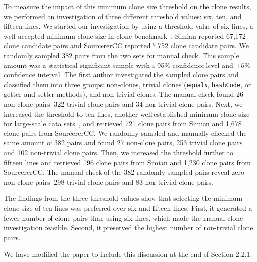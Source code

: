 \documentclass[a4paper,twoside,10pt]{reviewresponse}
\begin{document}
To measure the impact of this minimum clone size threshold on the clone results, 
we performed an investigation of three different threshold values: six, ten, and fifteen lines. 
We started our investigation by using a threshold value of six
lines, a well-accepted minimum clone size in clone benchmark~\cite{Bellon2007}.
Simian reported 67,172 clone candidate pairs and SourcererCC reported 7,752
clone candidate pairs. We randomly sampled 382 pairs from the two sets for
manual check. This sample amount was a statistical significant sample with a
95\% confidence level and $\pm 5\%$ confidence interval. The first author
investigated the sampled clone pairs and classified them into three groups:
non-clones, trivial clones (\texttt{equals}, \texttt{hashCode}, or getter and
setter methods), and non-trivial clones. The manual check found 26 non-clone
pairs; 322 trivial clone pairs and 34 non-trivial clone pairs. Next, we increased the
threshold to ten lines, another well-established minimum clone size for
large-scale data sets~\cite{Sajnani2016}, and retrieved 721 clone pairs from
Simian and 1,678 clone pairs from SourcererCC. We randomly sampled and manually
checked the same amount of 382 pairs and found 27 non-clone pairs, 253 trivial
clone pairs and 102 non-trivial clone pairs. Then, we increased the threshold
further to fifteen lines and retrieved 196 clone pairs from Simian and 1,230
clone pairs from SourcererCC. The manual check of the 382 randomly sampled pairs
reveal zero non-clone pairs, 298 trivial clone pairs and 83 non-trivial clone
pairs.

The findings from the three threshold values show that selecting the minimum clone size 
of ten lines was preferred over six and fifteen lines. First, it generated 
a fewer number of clone pairs than using six lines, which made the manual clone
investigation feasible. Second, it preserved the highest number of non-trivial clone
pairs.

We have modified the paper to include this discussion at the end of Section 2.2.1.

\end{document}
